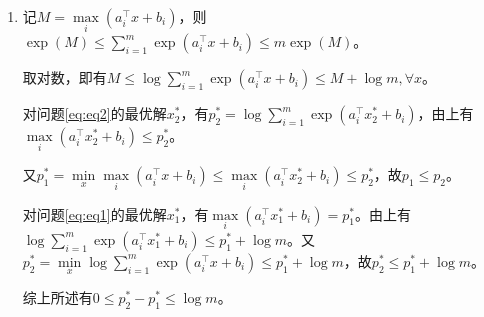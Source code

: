 \documentclass[cn,hazy,cyan,11pt,normal]{elegantnote}
\begin{document}
\begin{enumerate}
\begin{enumerate}
                \item 记$M=\max\limits_i (a^{\top}_i x+b_i)$，则$\exp(M)\leq\sum\limits_{i=1}^m \exp(a_i^{\top}x+b_i)\leq m\exp(M)$。

                    取对数，即有$M\leq\log\sum\limits_{i=1}^m \exp(a_i^{\top}x+b_i)\leq M+\log m,\forall x$。

                    对问题\ref{eq:eq2}的最优解$x_2^*$，有$p_2^*=\log\sum\limits_{i=1}^m \exp(a_i^{\top}x_2^*+b_i)$，由上有$\max\limits_i(a_i^{\top}x_2^*+b_i)\leq p_2^*$。

                    又$p_1^*=\min\limits_x \max\limits_i (a_i^{\top}x+b_i)\leq\max\limits_i(a_i^{\top}x_2^*+b_i)\leq p_2^*$，故$p_1\leq p_2$。

                    对问题\ref{eq:eq1}的最优解$x_1^*$，有$\max\limits_i(a_i^{\top}x_1^*+b_i)=p_1^*$。由上有$\log\sum\limits_{i=1}^m \exp(a_i^{\top}x_1^*+b_i)\leq p_1^*+\log m$。又$p_2^*=\min\limits_x \log\sum\limits_{i=1}^m \exp(a_i^{\top}x+b_i)\leq p_1^*+\log m$，故$p_2^*\leq p_1^*+\log m$。

                    综上所述有$0\leq p_2^*-p_1^*\leq \log m$。
            \end{enumerate}
    \end{enumerate}
\end{document}
